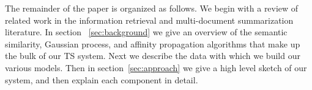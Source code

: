 The remainder of the paper is organized as follows. We begin with a review of related work in the information retrieval and multi-document summarization literature.  In section
~\ref{sec:background} we give an overview of the semantic similarity, 
Gaussian process, and affinity propagation algorithms that make up the bulk of
our TS system. 
Next we describe the data with which we build our various models.
Then in section~\ref{sec:approach} we give a high level sketch
of our system, and then explain each component in detail. 
